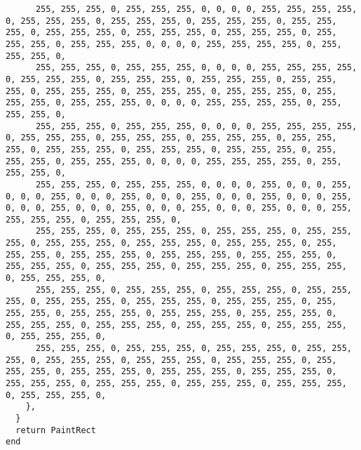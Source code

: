 \documentclass{ctexart}
\begin{document}
\begin{lstlisting}
      255, 255, 255, 0, 255, 255, 255, 0, 0, 0, 0, 255, 255, 255, 255, 0, 255, 255, 255, 0, 255, 255, 255, 0, 255, 255, 255, 0, 255, 255, 255, 0, 255, 255, 255, 0, 255, 255, 255, 0, 255, 255, 255, 0, 255, 255, 255, 0, 255, 255, 255, 0, 0, 0, 0, 255, 255, 255, 255, 0, 255, 255, 255, 0, 
      255, 255, 255, 0, 255, 255, 255, 0, 0, 0, 0, 255, 255, 255, 255, 0, 255, 255, 255, 0, 255, 255, 255, 0, 255, 255, 255, 0, 255, 255, 255, 0, 255, 255, 255, 0, 255, 255, 255, 0, 255, 255, 255, 0, 255, 255, 255, 0, 255, 255, 255, 0, 0, 0, 0, 255, 255, 255, 255, 0, 255, 255, 255, 0, 
      255, 255, 255, 0, 255, 255, 255, 0, 0, 0, 0, 255, 255, 255, 255, 0, 255, 255, 255, 0, 255, 255, 255, 0, 255, 255, 255, 0, 255, 255, 255, 0, 255, 255, 255, 0, 255, 255, 255, 0, 255, 255, 255, 0, 255, 255, 255, 0, 255, 255, 255, 0, 0, 0, 0, 255, 255, 255, 255, 0, 255, 255, 255, 0, 
      255, 255, 255, 0, 255, 255, 255, 0, 0, 0, 0, 255, 0, 0, 0, 255, 0, 0, 0, 255, 0, 0, 0, 255, 0, 0, 0, 255, 0, 0, 0, 255, 0, 0, 0, 255, 0, 0, 0, 255, 0, 0, 0, 255, 0, 0, 0, 255, 0, 0, 0, 255, 0, 0, 0, 255, 255, 255, 255, 0, 255, 255, 255, 0, 
      255, 255, 255, 0, 255, 255, 255, 0, 255, 255, 255, 0, 255, 255, 255, 0, 255, 255, 255, 0, 255, 255, 255, 0, 255, 255, 255, 0, 255, 255, 255, 0, 255, 255, 255, 0, 255, 255, 255, 0, 255, 255, 255, 0, 255, 255, 255, 0, 255, 255, 255, 0, 255, 255, 255, 0, 255, 255, 255, 0, 255, 255, 255, 0, 
      255, 255, 255, 0, 255, 255, 255, 0, 255, 255, 255, 0, 255, 255, 255, 0, 255, 255, 255, 0, 255, 255, 255, 0, 255, 255, 255, 0, 255, 255, 255, 0, 255, 255, 255, 0, 255, 255, 255, 0, 255, 255, 255, 0, 255, 255, 255, 0, 255, 255, 255, 0, 255, 255, 255, 0, 255, 255, 255, 0, 255, 255, 255, 0, 
      255, 255, 255, 0, 255, 255, 255, 0, 255, 255, 255, 0, 255, 255, 255, 0, 255, 255, 255, 0, 255, 255, 255, 0, 255, 255, 255, 0, 255, 255, 255, 0, 255, 255, 255, 0, 255, 255, 255, 0, 255, 255, 255, 0, 255, 255, 255, 0, 255, 255, 255, 0, 255, 255, 255, 0, 255, 255, 255, 0, 255, 255, 255, 0, 
    },
  }
  return PaintRect
end


\end{lstlisting}
\end{document}
